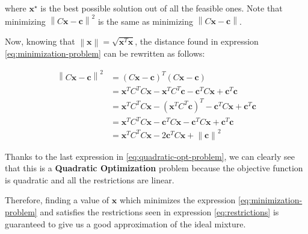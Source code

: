 \documentclass[11pt,a4paper]{article}
\newcommand{\norm}[1]{\left\lVert#1\right\rVert}
\newcommand{\algebraVector}[1]{\boldsymbol{#1}}
\begin{document}
\noindent where $\algebraVector{x}^\star$ is the best possible solution out of all the
feasible ones. Note that minimizing $\norm{C\algebraVector{x} - \algebraVector{c}}^2$
is the same as minimizing $\norm{C\algebraVector{x} - \algebraVector{c}}$.

Now, knowing that $\norm{\algebraVector{x}} = \sqrt{\algebraVector{x}^T\algebraVector{x}}$, the
distance found in expression \eqref{eq:minimization-problem} can be rewritten as follows:

\begin{equation}
  \label{eq:quadratic-opt-problem}
\begin{aligned}
  \norm{C\algebraVector{x} - \algebraVector{c}}^2 &=
  (C\algebraVector{x} - \algebraVector{c})^T (C\algebraVector{x} - \algebraVector{c})\\
  &= \algebraVector{x}^T C^T C \algebraVector{x} - \algebraVector{x}^T C^T \algebraVector{c} - \algebraVector{c}^T C \algebraVector{x} + \algebraVector{c}^T \algebraVector{c} \\
  & = \algebraVector{x}^T C^T C \algebraVector{x} - (\algebraVector{x}^T C^T \algebraVector{c})^T - \algebraVector{c}^T C \algebraVector{x} + \algebraVector{c}^T \algebraVector{c} \\
  & = \algebraVector{x}^T C^T C \algebraVector{x} - \algebraVector{c}^T C \algebraVector{x} - \algebraVector{c}^T C \algebraVector{x} + \algebraVector{c}^T \algebraVector{c} \\
  & = \algebraVector{x}^T C^T C \algebraVector{x} - 2\algebraVector{c}^T C \algebraVector{x} + \norm{\algebraVector{c}}^2
\end{aligned}
\end{equation}

Thanks to the last expression in \eqref{eq:quadratic-opt-problem}, we can clearly see that
this is a \textbf{Quadratic Optimization} problem because the objective function is quadratic and
all the restrictions are linear.

Therefore, finding a value of $\algebraVector{x}$ which minimizes the expression
\eqref{eq:minimization-problem} and satisfies the restrictions seen in expression
\eqref{eq:restrictions} is guaranteed to give us a good approximation of the ideal mixture.
\end{document}

